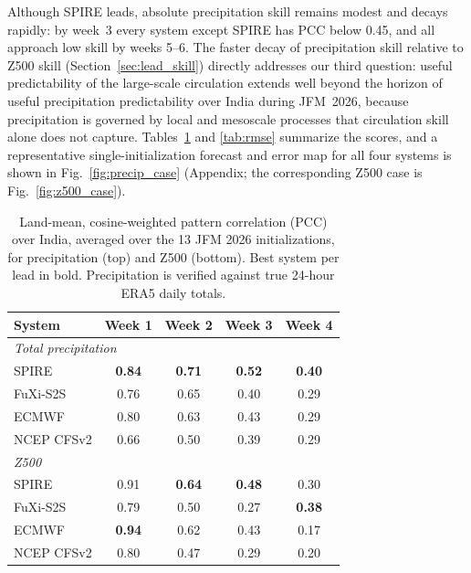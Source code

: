 \documentclass[11pt]{article}
\begin{document}
Although SPIRE leads, absolute precipitation skill remains modest and
decays rapidly: by week~3 every system except SPIRE has PCC below 0.45,
and all approach low skill by weeks 5--6. The faster decay of
precipitation skill relative to Z500 skill (Section~\ref{sec:lead_skill})
directly addresses our third question: useful predictability of the
large-scale circulation extends well beyond the horizon of useful
precipitation predictability over India during JFM~2026, because
precipitation is governed by local and mesoscale processes that
circulation skill alone does not capture. Tables~\ref{tab:acc} and
\ref{tab:rmse} summarize the scores, and a representative
single-initialization forecast and error map for all four systems is
shown in Fig.~\ref{fig:precip_case} (Appendix; the corresponding Z500
case is Fig.~\ref{fig:z500_case}).

\begin{table}[t]
  \centering
  \caption{Land-mean, cosine-weighted pattern correlation (PCC) over
  India, averaged over the 13 JFM 2026 initializations, for
  precipitation (top) and Z500 (bottom). Best system per lead in bold.
  Precipitation is verified against true 24-hour ERA5 daily totals.}
  \label{tab:acc}
  \begin{tabular}{lcccc}
    \toprule
    System & Week 1 & Week 2 & Week 3 & Week 4 \\
    \midrule
    \multicolumn{5}{l}{\emph{Total precipitation}}\\
    SPIRE        & \textbf{0.84} & \textbf{0.71} & \textbf{0.52} & \textbf{0.40} \\
    FuXi-S2S     & 0.76 & 0.65 & 0.40 & 0.29 \\
    ECMWF        & 0.80 & 0.63 & 0.43 & 0.29 \\
    NCEP CFSv2   & 0.66 & 0.50 & 0.39 & 0.29 \\
    \midrule
    \multicolumn{5}{l}{\emph{Z500}}\\
    SPIRE        & 0.91 & \textbf{0.64} & \textbf{0.48} & 0.30 \\
    FuXi-S2S     & 0.79 & 0.50 & 0.27 & \textbf{0.38} \\
    ECMWF        & \textbf{0.94} & 0.62 & 0.43 & 0.17 \\
    NCEP CFSv2   & 0.80 & 0.47 & 0.29 & 0.20 \\
    \bottomrule
  \end{tabular}
\end{table}
\end{document}
